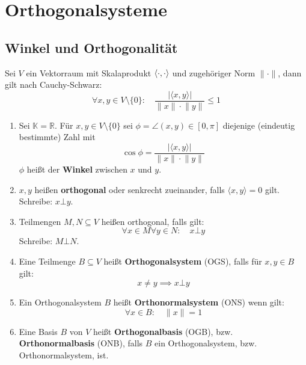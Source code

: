 \documentclass[parskip,a4paper,twoside,DIV15,BCOR12mm]{scrbook}
\begin{document}
\chapter{Orthogonalsysteme}
\section{Winkel und Orthogonalität}
\begin{prerem}
Sei \(V\) ein Vektorraum mit Skalaprodukt \(\operatorname{\langle\cdot,\cdot\rangle}\) und zugehöriger Norm 
\(\lVert\cdot\rVert\), dann gilt nach Cauchy-Schwarz:
\[
\forall x,y\in V\setminus\{0\}:\quad\frac{\lvert\langle x,y\rangle\rvert}{\lVert x\rVert\cdot\lVert y\rVert}\leq 1
\]
\end{prerem}
\begin{definition}
\begin{enumerate}
\item Sei \(\mathbb{K}=\mathbb{R}\). Für \(x,y\in V\setminus\{0\}\) sei 
\(\phi=\angle(x,y)\in[0,\pi]\) diejenige (eindeutig bestimmte) Zahl mit
\[
\cos\phi=\frac{\lvert\langle x,y\rangle\rvert}{\lVert x\rVert\cdot\lVert y\rVert}
\]
\(\phi\) heißt der \textbf{Winkel} zwischen \(x\) und \(y\).
\item \(x,y\) heißen \textbf{orthogonal} oder senkrecht zueinander, falls
\(\langle x,y\rangle=0\) gilt.\\
Schreibe: \(x\bot y\).
\item Teilmengen \(M,N\subseteq V\) heißen orthogonal, falls gilt:
\[
\forall x\in M\forall y\in N:\quad x\bot y
\]
Schreibe: \(M\bot N\).
\item Eine Teilmenge \(B\subseteq V\) heißt \textbf{Orthogonalsystem} (OGS),
falls für \(x,y\in B\) gilt: 
\[
x\neq y\implies x\bot y
\]
\item Ein Orthogonalsystem \(B\) heißt \textbf{Orthonormalsystem} (ONS) wenn
gilt:
\[
\forall x\in B:\quad\lVert x\rVert=1
\]
\item Eine Basis \(B\) von \(V\) heißt \textbf{Orthogonalbasis} (OGB), bzw.
\textbf{Orthonormalbasis} (ONB), falls \(B\) ein Orthogonalsystem, bzw.
Orthonormalsystem, ist.
\end{enumerate}
\end{definition}
\end{document}
